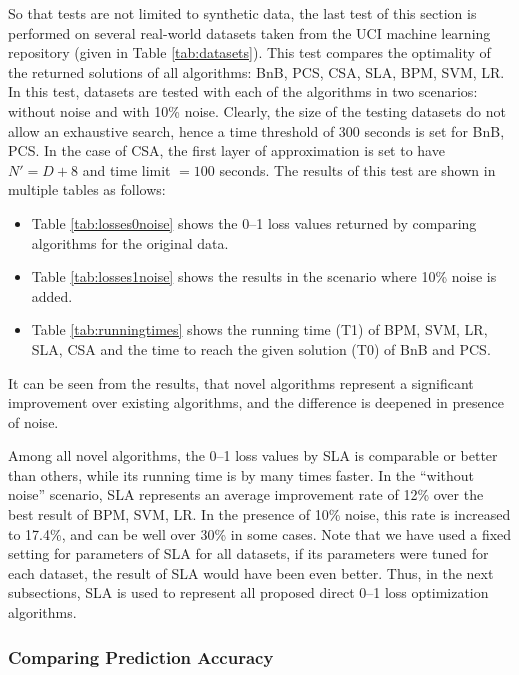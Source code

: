 So that tests are not limited to synthetic data, the last test of this section is performed on several real-world datasets taken from the UCI machine learning repository (given in Table \ref{tab:datasets}). This test compares the optimality of the returned solutions of all algorithms: BnB, PCS, CSA, SLA, BPM, SVM, LR. In this test, datasets are tested with each of the algorithms in two scenarios: without noise and with 10\% noise. Clearly, the size of the testing datasets do not allow an exhaustive search, hence a time threshold of 300 seconds is set for BnB, PCS. In the case of CSA, the first layer of approximation is set to have $N'=D+8$ and  time limit $=100$ seconds. The results of this test are shown in multiple tables as follows:
\begin{itemize}
\setlength{\itemsep}{4pt} 
\setlength{\parskip}{1pt}
\setlength{\parsep}{1pt}
\item Table \ref{tab:losses0noise} shows the 0--1 loss values returned by comparing algorithms for the original data.
\item Table \ref{tab:losses1noise} shows the results in the scenario where 10\% noise is added.
\item Table \ref{tab:runningtimes} shows the running time (T1) of BPM, SVM, LR, SLA, CSA and the time to reach the given solution (T0) of BnB and PCS.
\end{itemize}

It can be seen from the results, that novel algorithms represent a significant improvement over existing algorithms, and the difference is deepened in presence of noise. 

Among all novel algorithms, the 0--1 loss values by SLA is comparable or better than others, while its running time is by many times faster. In the ``without noise'' scenario, SLA represents an average improvement rate of 12\% over the best result of BPM, SVM, LR. In the presence of 10\% noise, this rate is increased to 17.4\%, and can be well over 30\% in some cases. Note that we have used a fixed setting for parameters of SLA for all datasets, if its parameters were tuned for each dataset, the result of SLA would have been even better. Thus, in the next subsections, SLA is used to represent all proposed direct 0--1 loss optimization algorithms. 


\subsubsection{Comparing Prediction Accuracy}
\label{ssec:rc.prediction}

